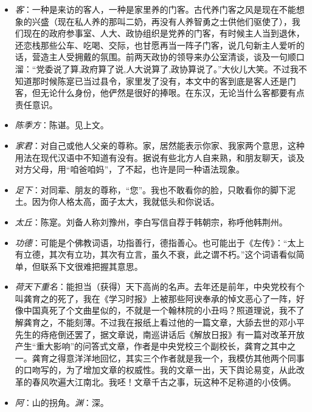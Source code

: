 \documentclass[]{book}
\providecommand{\tightlist}{%
  \setlength{\itemsep}{0pt}\setlength{\parskip}{0pt}}
\begin{document}
\begin{itemize}
\tightlist
\item
  \emph{客}：一种是来访的客人，一种是家里养的门客。古代养门客之风是现在不能想象的兴盛（现在私人养的那叫二奶，再没有人养智勇之士供他们驱使了），我们现在的政府参事室、人大、政协组织是党养的门客，有时候主人当到退休，还恋栈那些公车、吃喝、交际，也甘愿再当一阵子门客，说几句新主人爱听的话，营造主人受拥戴的氛围。前两天政协的领导来办公室清谈，谈及一句顺口溜：``党委说了算,政府算了说,人大说算了,政协算说了。''大伙儿大笑。不过我不知道那时候陈寔已当过县令，家里发了没有，本文中的客到底是客人还是门客，但无论什么身份，他俨然是很好的捧哏。在东汉，无论当什么客都要有点责任意识。
\item
  \emph{陈季方}：陈谌。见上文。
\item
  \emph{家君}：对自己或他人父亲的尊称。家，居然能表示你家、我家两个意思，这种用法在现代汉语中不知道有没有。据说有些北方人自来熟，和朋友聊天，谈及对方父母，用``咱爸咱妈''，了不起，也许是同一种语法现象。
\item
  \emph{足下}：对同辈、朋友的尊称，``您''。我也不敢看你的脸，只敢看你的脚下泥土。因为你人格太高，面子太大，我就低头和你说话。
\item
  \emph{太丘}：陈寔。刘备人称刘豫州，李白写信自荐于韩朝宗，称呼他韩荆州。
\item
  \emph{功德}：可能是个佛教词语，功指善行，德指善心。也可能出于《左传》：``太上有立德，其次有立功，其次有立言，虽久不衰，此之谓不朽。''这个词语看似简单，但联系下文很难把握其意思。
\item
  \emph{荷天下重名}：能担当（获得）天下高尚的名声。去年还是前年，中央党校有个叫龚育之的死了，我在《学习时报》上被那些阿谀奉承的悼文恶心了一阵，好像中国真死了个文曲星似的，不就是一个翰林院的小丑吗？照道理说，我不了解龚育之，不能刻薄。不过我在报纸上看过他的一篇文章，大舔去世的邓小平先生的痔疮倒还罢了，据文章说，南巡讲话后《解放日报》有一篇对改革开放产生``重大影响''的问答式文章，作者是中央党校三个副校长，龚育之其中之一。龚育之得意洋洋地回忆，其实三个作者就是我一个，我模仿其他两个同事的口吻写的，为了增加文章的权威性。我的文章一出，天下舆论易变，从此改革的春风吹遍大江南北。我呸！文章千古之事，玩这种不足称道的小伎俩。
\item
  \emph{阿}：山的拐角。\emph{渊}：深。
\end{itemize}
\end{document}
